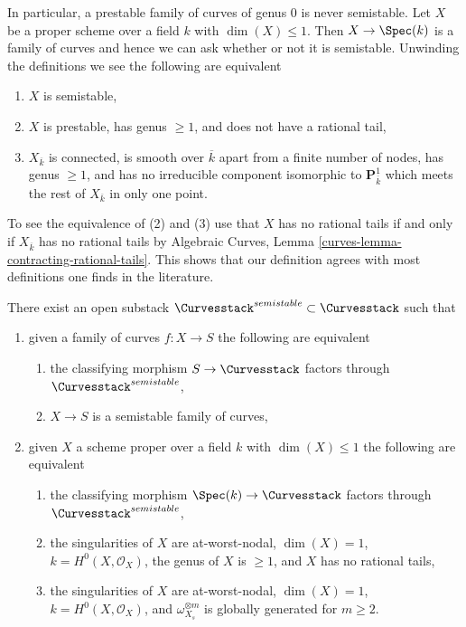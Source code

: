 \noindent
In particular, a prestable family of curves of genus $0$ is never
semistable.
Let $X$ be a proper scheme over a field $k$ with $\dim(X) \leq 1$.
Then $X \to \Spec(k)$ is a family of curves and hence we can ask
whether or not it is semistable. Unwinding the definitions we see
the following are equivalent
\begin{enumerate}
\item $X$ is semistable,
\item $X$ is prestable, has genus $\geq 1$, and does not have a rational tail,
\item $X_{\overline{k}}$ is connected, is smooth over $\overline{k}$
apart from a finite number of nodes, has genus $\geq 1$, and has no
irreducible component isomorphic to $\mathbf{P}^1_{\overline{k}}$
which meets the rest of $X_{\overline{k}}$ in only one point.
\end{enumerate}
To see the equivalence of (2) and (3) use that $X$ has no rational tails
if and only if $X_{\overline{k}}$ has no rational tails by
Algebraic Curves, Lemma \ref{curves-lemma-contracting-rational-tails}.
This shows that our definition agrees with most definitions one finds
in the literature.

\begin{lemma}
\label{lemma-semistable-curves}
There exist an open substack $\Curvesstack^{semistable} \subset \Curvesstack$
such that
\begin{enumerate}
\item given a family of curves $f : X \to S$ the following are equivalent
\begin{enumerate}
\item the classifying morphism $S \to \Curvesstack$ factors
through $\Curvesstack^{semistable}$,
\item $X \to S$ is a semistable family of curves,
\end{enumerate}
\item given $X$ a scheme proper over a field $k$ with
$\dim(X) \leq 1$ the following are equivalent
\begin{enumerate}
\item the classifying morphism $\Spec(k) \to \Curvesstack$
factors through $\Curvesstack^{semistable}$,
\item the singularities of $X$ are at-worst-nodal, $\dim(X) = 1$,
$k = H^0(X, \mathcal{O}_X)$, the genus of $X$ is $\geq 1$, and
$X$ has no rational tails,
\item the singularities of $X$ are at-worst-nodal, $\dim(X) = 1$,
$k = H^0(X, \mathcal{O}_X)$, and $\omega_{X_s}^{\otimes m}$ is
globally generated for $m \geq 2$.
\end{enumerate}
\end{enumerate}
\end{lemma}

